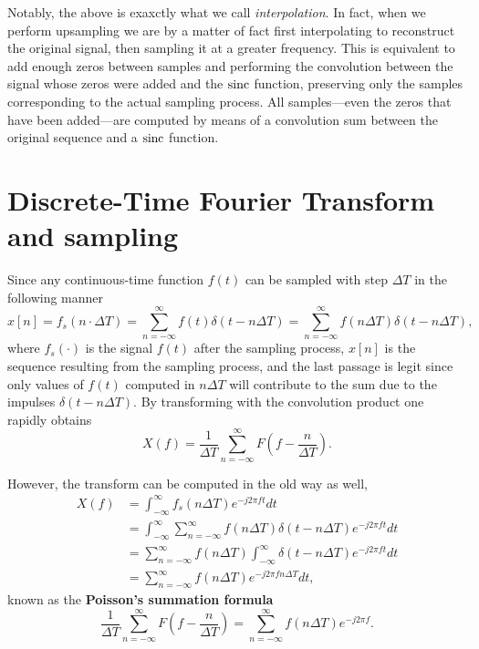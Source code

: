 \documentclass[\documentfontsize, twocolumn]{\classname}
\begin{document}
Notably, the above is exaxctly what we call \emph{interpolation}. In fact, when we perform upsampling we are by a matter of fact first interpolating to reconstruct the original signal, then sampling it at a greater frequency. This is equivalent to add enough zeros between samples and performing the convolution between the signal whose zeros were added and the $\operatorname{sinc}$ function, preserving only the samples corresponding to the actual sampling process. All samples---even the zeros that have been added---are computed by means of a convolution sum between the original sequence and a $\operatorname{sinc}$ function.

\section{Discrete-Time Fourier Transform and sampling}

Since any continuous-time function $f(t)$ can be sampled with step $\Delta T$ in the following manner
\[
    x[n] = f_s(n\cdot \Delta T) = \sum_{n=-\infty}^\infty f(t)\delta(t - n \Delta T) = \sum_{n=-\infty}^\infty f(n\Delta T)\delta (t - n\Delta T),
\]
where $f_s(\cdot)$ is the signal $f(t)$ after the sampling process, $x[n]$ is the sequence resulting from the sampling process, and the last passage is legit since only values of $f(t)$ computed in $n\Delta T$ will contribute to the sum due to the impulses $\delta(t - n \Delta T)$. By transforming with the convolution product one rapidly obtains
\[
    X(f) =  \frac{1}{\Delta T} \sum_{n=-\infty}^\infty F\left(f - \frac n {\Delta T}\right).
\]

However, the transform can be computed in the old way as well,
\begin{align*}
    X(f) &= \int_{-\infty}^\infty f_s(n\Delta T) e^{-j2\pi f t} dt\\
         &= \int_{-\infty}^\infty \sum_{n=-\infty}^\infty f(n\Delta T) \delta (t-n\Delta T) e^{-j2\pi f t} dt\\
         &= \sum_{n=-\infty}^\infty f(n\Delta T)\int_{-\infty}^\infty  \delta (t-n\Delta T) e^{-j2\pi f t} dt\\
         &= \sum_{n=-\infty}^\infty f(n\Delta T)e^{-j2\pi f n \Delta T} dt,
\end{align*}
known as the \textbf{Poisson's summation formula}
\begin{equation}\label{eqn:poissonSummationFormula}
    \frac{1}{\Delta T} \sum_{n=-\infty}^\infty F\left(f - \frac n {\Delta T}\right) = \sum_{n=-\infty}^\infty f(n\Delta T) e^{-j2\pi f}.
\end{equation}
\end{document}

